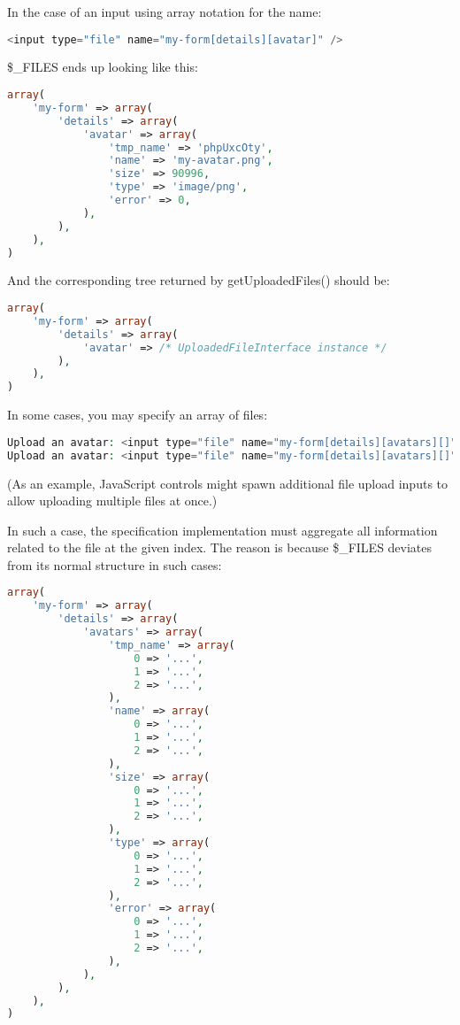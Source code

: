 In the case of an input using array notation for the name:



\begin{lstlisting}[language=PHP]
<input type="file" name="my-form[details][avatar]" />
\end{lstlisting}

\$\_FILES ends up looking like this:



\begin{lstlisting}[language=PHP]
array(
    'my-form' => array(
        'details' => array(
            'avatar' => array(
                'tmp_name' => 'phpUxcOty',
                'name' => 'my-avatar.png',
                'size' => 90996,
                'type' => 'image/png',
                'error' => 0,
            ),
        ),
    ),
)
\end{lstlisting}

And the corresponding tree returned by getUploadedFiles() should be:



\begin{lstlisting}[language=PHP]
array(
    'my-form' => array(
        'details' => array(
            'avatar' => /* UploadedFileInterface instance */
        ),
    ),
)
\end{lstlisting}

In some cases, you may specify an array of files:



\begin{lstlisting}[language=PHP]
Upload an avatar: <input type="file" name="my-form[details][avatars][]" />
Upload an avatar: <input type="file" name="my-form[details][avatars][]" />
\end{lstlisting}

(As an example, JavaScript controls might spawn additional file upload inputs to allow uploading multiple files at once.)

In such a case, the specification implementation must aggregate all information related to the file at the given index. The reason is because \$\_FILES deviates from its normal structure in such cases:

\begin{lstlisting}[language=PHP]
array(
    'my-form' => array(
        'details' => array(
            'avatars' => array(
                'tmp_name' => array(
                    0 => '...',
                    1 => '...',
                    2 => '...',
                ),
                'name' => array(
                    0 => '...',
                    1 => '...',
                    2 => '...',
                ),
                'size' => array(
                    0 => '...',
                    1 => '...',
                    2 => '...',
                ),
                'type' => array(
                    0 => '...',
                    1 => '...',
                    2 => '...',
                ),
                'error' => array(
                    0 => '...',
                    1 => '...',
                    2 => '...',
                ),
            ),
        ),
    ),
)
\end{lstlisting}

